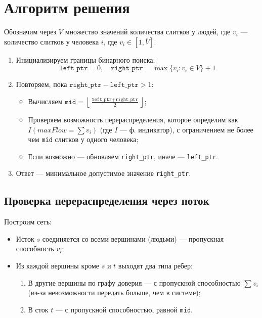 \documentclass{article}
\begin{document}
\section{Алгоритм решения}

Обозначим через $V$ множество значений количества слитков у людей, где $v_i$ — количество слитков у человека $i$, где $v_i \in [1, \bar{V}]$.

\begin{enumerate}
    \item Инициализируем границы бинарного поиска:
          \[
              \texttt{left\_ptr} = 0,\quad \texttt{right\_ptr} = \max\{v_i : v_i \in V\} + 1
          \]

    \item Повторяем, пока $\texttt{right\_ptr} - \texttt{left\_ptr} > 1$:
          \begin{itemize}
              \item Вычисляем $\texttt{mid} = \left\lfloor \frac{\texttt{left\_ptr} + \texttt{right\_ptr}}{2} \right\rfloor$;
              \item Проверяем возможность перераспределения, которое определим как $I(maxFlow = \sum{v_i})$ (где $I$ — ф. индикатор), с ограничением не более чем \texttt{mid} слитков у одного человека;
              \item Если возможно — обновляем \texttt{right\_ptr}, иначе — \texttt{left\_ptr}.
          \end{itemize}

    \item Ответ — минимальное допустимое значение \texttt{right\_ptr}.
\end{enumerate}

\subsection{Проверка перераспределения через поток}

Построим сеть:
\begin{itemize}
    \item Исток $s$ соединяется со всеми вершинами (людьми) — пропускная способность $v_i$;
    \item Из каждой вершины кроме $s$ и $t$ выходят два типа ребер:
          \begin{enumerate}
              \item В другие вершины по графу доверия — с пропускной способностью $\sum{v_i}$ (из-за невозможности передать больше, чем в системе);
              \item В сток $t$ — с пропускной способностью, равной \texttt{mid}.
          \end{enumerate}
\end{itemize}
\end{document}
